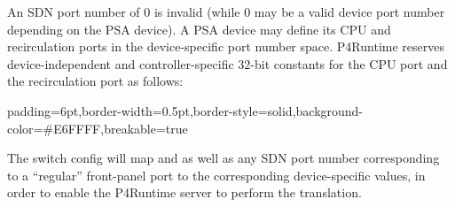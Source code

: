 \documentclass[11pt]{article}
\begin{document}
{%
An SDN port number of 0 is invalid (while 0 may be a valid device port number
depending on the PSA device). A PSA device may define its CPU and recirculation
ports in the device-specific port number space. P4Runtime reserves
device-independent and controller-specific 32-bit constants for the CPU port and
the recirculation port as follows:%

\begin{mdbmargintb}{6pt}{6pt}%
\begin{mdblock}{padding=6pt,border-width=0.5pt,border-style=solid,background-color=\#E6FFFF,breakable=true}%
\begin{mdpre}%
\end{mdpre}%
\end{mdblock}%
\end{mdbmargintb}%

\noindent{}The switch config will map  and  \textemdash{} as well
as any SDN port number corresponding to a \textquotedblleft{}regular\textquotedblright{} front-panel port \textemdash{} to the
corresponding device-specific values, in order to enable the P4Runtime server to
perform the translation.%

}
\end{document}
